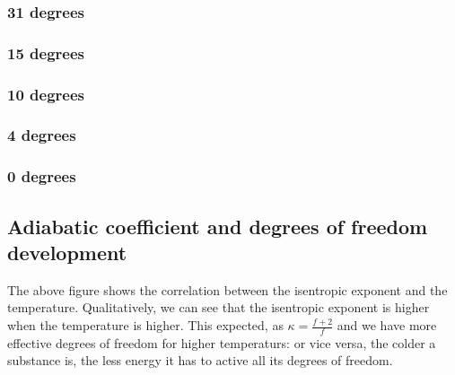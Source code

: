 \documentclass[../main.tex]{subfiles}
\begin{document}
        \subsubsection*{31 degrees}
            
            

        \subsubsection*{15 degrees}
            
            

        \subsubsection*{10 degrees}
            
            

        \subsubsection*{4 degrees}
            
            
        
        \subsubsection*{0 degrees}
            
            

    \subsection*{Adiabatic coefficient and degrees of freedom development}
        
        The above figure shows the correlation between the isentropic exponent and the temperature. Qualitatively, we can see that the isentropic exponent is higher when the temperature is higher. This expected, as $\kappa=\frac{f+2}{f}$ and we have more effective degrees of freedom for higher temperaturs: or vice versa, the colder a substance is, the less energy it has to active all its degrees of freedom.\\
\end{document}
